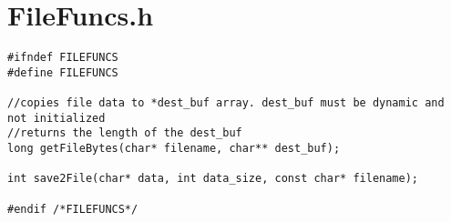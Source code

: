 \section{FileFuncs.h}
\label{FILEFUNCSH}

\begin{lstlisting}
#ifndef FILEFUNCS
#define FILEFUNCS

//copies file data to *dest_buf array. dest_buf must be dynamic and not initialized
//returns the length of the dest_buf
long getFileBytes(char* filename, char** dest_buf);

int save2File(char* data, int data_size, const char* filename);

#endif /*FILEFUNCS*/

\end{lstlisting}